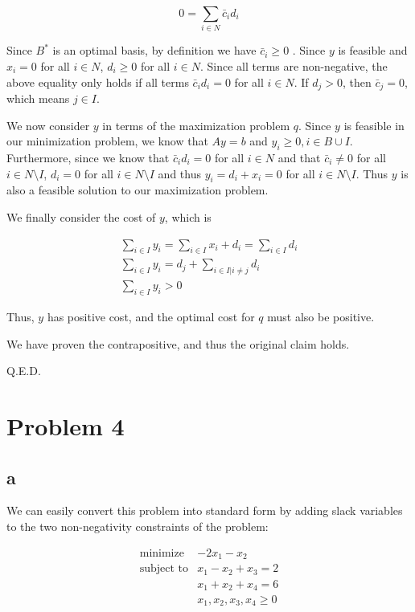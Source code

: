 \documentclass[11pt,a4paper]{article}
\begin{document}
$$
0=\sum_{i\in N}\bar{c}_id_i
$$

Since $B^*$ is an optimal basis, by definition we have $\bar{c}_i\geq 0$ . Since $y$ is feasible and $x_i=0$ for all $i\in N$, $d_i\geq 0$ for all $i\in N$. Since all terms are non-negative, the above equality only holds if all terms $\bar{c}_id_i=0$ for all $i\in N$. If $d_j>0$, then $\bar{c}_j=0$, which means $j\in I$.

We now consider $y$ in terms of the maximization problem $q$. Since $y$ is feasible in our minimization problem, we know that $Ay=b$ and $y_i\geq 0, i\in B\cup I$. Furthermore, since we know that $\bar{c}_id_i=0$ for all $i\in N$ and that $\bar{c}_i\neq 0$ for all $i\in N\texttt{\textbackslash}I$, $d_i=0$ for all $i\in N\texttt{\textbackslash}I$ and thus $y_i=d_i+x_i=0$ for all $i\in N\texttt{\textbackslash}I$. Thus $y$ is also a feasible solution to our maximization problem.

We finally consider the cost of $y$, which is

\begin{equation}
\begin{split}
\sum_{i\in I} y_i =\sum_{i\in I} x_i+d_i=\sum_{i\in I}d_i\\
\sum_{i\in I} y_i = d_j +\sum_{i\in I|i\neq j}d_i\\
\sum_{i\in I} y_i > 0
\end{split}
\end{equation}

Thus, $y$ has positive cost, and the optimal cost for $q$ must also be positive.

We have proven the contrapositive, and thus the original claim holds.

Q.E.D.

\section*{Problem 4}
\subsection*{a}

We can easily convert this problem into standard form by adding slack variables to the two non-negativity constraints of the problem:

$$
\begin{array}{ll}
\text{minimize}  & -2x_1-x_2\\
\text{subject to}& x_1-x_2+x_3=2\\
                 & x_1+x_2+x_4=6\\
                 & x_1, x_2, x_3, x_4\geq 0\\
\end{array}
$$
\end{document}
